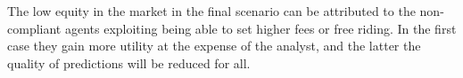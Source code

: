 The low equity in the market in the final scenario can be attributed to the
non-compliant agents exploiting being able to set higher fees or free riding.
In the first case they gain more utility at the expense of the analyst, and
the latter the quality of predictions will be reduced for all.







